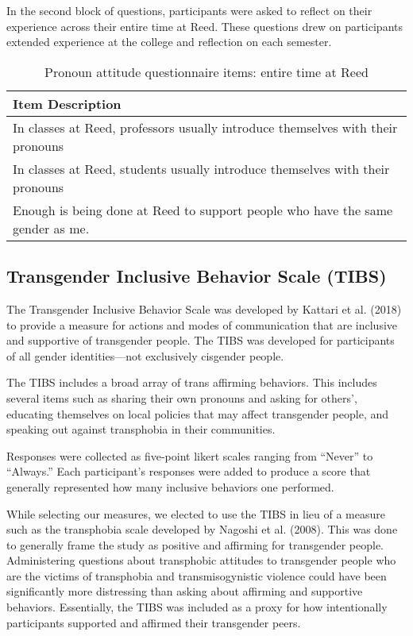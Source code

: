 \documentclass[12pt,twoside]{reedthesis}
\begin{document}
In the second block of questions, participants were asked to reflect on their experience across their entire time at Reed. These questions drew on participants extended experience at the college and reflection on each semester.
\begin{longtable}[t]{>{\raggedright\arraybackslash}p{35em}}
\caption{\label{tab:unnamed-chunk-2}Pronoun attitude questionnaire items: entire time at Reed}\\
\toprule
Item Description\\
\midrule
In classes at Reed, professors usually introduce themselves with their pronouns\\
In classes at Reed, students usually introduce themselves with their pronouns\\
Enough is being done at Reed to support people who have the same gender as me.\\
\bottomrule
\end{longtable}
\hypertarget{transgender-inclusive-behavior-scale-tibs}{%
\subsection{Transgender Inclusive Behavior Scale (TIBS)}\label{transgender-inclusive-behavior-scale-tibs}}

The Transgender Inclusive Behavior Scale was developed by Kattari et al. (2018) to provide a measure for actions and modes of communication that are inclusive and supportive of transgender people. The TIBS was developed for participants of all gender identities---not exclusively cisgender people.

The TIBS includes a broad array of trans affirming behaviors. This includes several items such as sharing their own pronouns and asking for others', educating themselves on local policies that may affect transgender people, and speaking out against transphobia in their communities.

Responses were collected as five-point likert scales ranging from ``Never'' to ``Always.'' Each participant's responses were added to produce a score that generally represented how many inclusive behaviors one performed.

While selecting our measures, we elected to use the TIBS in lieu of a measure such as the transphobia scale developed by Nagoshi et al. (2008). This was done to generally frame the study as positive and affirming for transgender people. Administering questions about transphobic attitudes to transgender people who are the victims of transphobia and transmisogynistic violence could have been significantly more distressing than asking about affirming and supportive behaviors. Essentially, the TIBS was included as a proxy for how intentionally participants supported and affirmed their transgender peers.
\end{document}
